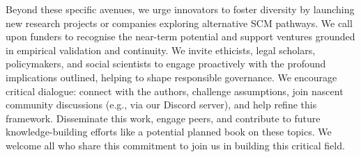 \documentclass[10pt]{article}
\begin{document}
\begin{sloppypar}
  Beyond these specific avenues, we urge innovators to foster diversity by launching new research projects or companies exploring alternative SCM pathways. We call upon funders to recognise the near-term potential and support ventures grounded in empirical validation and continuity. We invite ethicists, legal scholars, policymakers, and social scientists to engage proactively with the profound implications outlined, helping to shape responsible governance. We encourage critical dialogue: connect with the authors, challenge assumptions, join nascent community discussions (e.g., via our Discord server), and help refine this framework. Disseminate this work, engage peers, and contribute to future knowledge-building efforts like a potential planned book on these topics. We welcome all who share this commitment to join us in building this critical field.


  \pagebreak
  
  
  \nocite{*}

\end{sloppypar}
\end{document}

